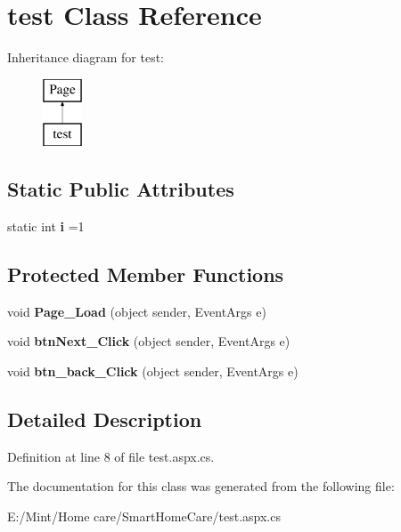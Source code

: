 \hypertarget{classtest}{\section{test Class Reference}
\label{classtest}
}
Inheritance diagram for test\-:\begin{figure}[H]
\begin{center}
\leavevmode
\includegraphics[height=2.000000cm]{classtest}
\end{center}
\end{figure}
\subsection*{Static Public Attributes}
\begin{DoxyCompactItemize}
\item 
\hypertarget{classtest_aba0f828b97e0e7b1bb62fad562eebb2c}{static int {\bfseries i} =1}\label{classtest_aba0f828b97e0e7b1bb62fad562eebb2c}

\end{DoxyCompactItemize}
\subsection*{Protected Member Functions}
\begin{DoxyCompactItemize}
\item 
\hypertarget{classtest_abf4d31a76a10eccc3764d0f6e7459490}{void {\bfseries Page\-\_\-\-Load} (object sender, Event\-Args e)}\label{classtest_abf4d31a76a10eccc3764d0f6e7459490}

\item 
\hypertarget{classtest_a50c23d16f9406ccb3d03f2fe26cf6727}{void {\bfseries btn\-Next\-\_\-\-Click} (object sender, Event\-Args e)}\label{classtest_a50c23d16f9406ccb3d03f2fe26cf6727}

\item 
\hypertarget{classtest_a31cfe2c19bc0fa1a2a3dc80ac8185331}{void {\bfseries btn\-\_\-back\-\_\-\-Click} (object sender, Event\-Args e)}\label{classtest_a31cfe2c19bc0fa1a2a3dc80ac8185331}

\end{DoxyCompactItemize}


\subsection{Detailed Description}


Definition at line 8 of file test.\-aspx.\-cs.



The documentation for this class was generated from the following file\-:\begin{DoxyCompactItemize}
\item 
E\-:/\-Mint/\-Home care/\-Smart\-Home\-Care/test.\-aspx.\-cs\end{DoxyCompactItemize}
